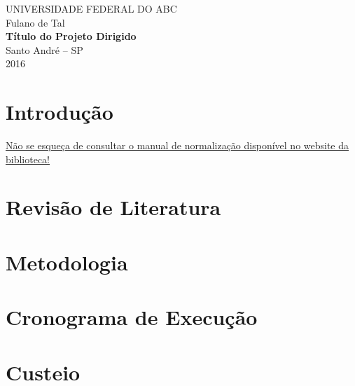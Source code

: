 \documentclass[12pt,twoside]{report}
\providecommand{\keywords}[1]{\textbf{{Keywords:}} #1}
\providecommand{\palavraschave}[1]{\textbf{{Palavras-chave:}} #1}
\begin{document}
	\begin{titlepage}
		\center
		{\large UNIVERSIDADE FEDERAL DO ABC}\\[4cm]
		{\large Fulano de Tal}\\[4cm]
		{\large \bf Título do Projeto Dirigido}\\[10cm]
		Santo André -- SP\\
		2016	
	\end{titlepage}
	
	\renewcommand{\abstractname}{Resumo}
	
	\begin{abstract}
		Aqui vai o resumo \\
		
		\palavraschave{}
	\end{abstract}
	
	\renewcommand{\abstractname}{Abstract}
	\begin{abstract}
		Here is the abstract.\\
		
		\keywords{}
	\end{abstract}
	\tableofcontents \thispagestyle{empty}
	\vfill
	\pagebreak
	
	\chapter{Introdução}\setcounter{page}{5} \pagestyle{plain}
		
	\href{http://portal.biblioteca.ufabc.edu.br/images/Publicacoes/Guia_ABNT_VANCOUVER_IEEE_2015.pdf}{Não se esqueça de consultar o manual de normalização disponível no website da biblioteca!}
	
	\chapter{Revisão de Literatura}
	
    
	
	\chapter{Metodologia}
	
    
	
	\chapter{Cronograma de Execução}
	


	\chapter{Custeio}


	
	
	
	
\end{document}
